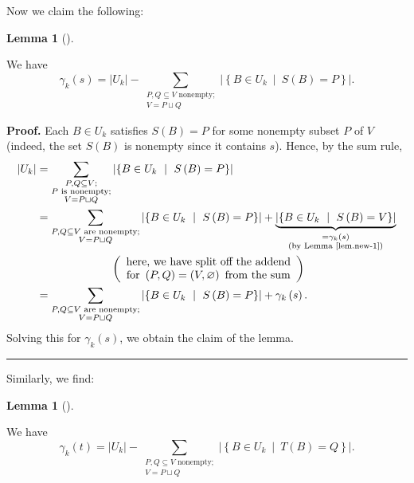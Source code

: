 \documentclass[numbers=enddot,12pt,final,onecolumn,notitlepage]{scrartcl}%
\theoremstyle{definition}
\newtheorem{lem}[theo]{Lemma}
\newenvironment{lemma}[1][]
{\begin{lem}[#1]\begin{leftbar}}
{\end{leftbar}\end{lem}}
\newenvironment{proof}[1][Proof]{\noindent\textbf{#1.} }{\ \rule{0.5em}{0.5em}}
\let\sumnonlimits\sum
\renewcommand{\sum}{\sumnonlimits\limits}
\theoremstyle{plainsl}
\begin{document}
Now we claim the following:

\begin{lemma}
\label{lem.new1} We have%
\[
\gamma_{k}\left(  s\right)  =\left\vert U_{k}\right\vert -\sum
_{\substack{P,Q\subseteq V\text{ nonempty;}\\V=P\sqcup Q}}\left\vert \left\{
B\in U_{k}\ \mid\ S\left(  B\right)  =P\right\}  \right\vert .
\]

\end{lemma}

\begin{proof}
Each $B\in U_{k}$ satisfies $S\left(  B\right)  =P$ for some nonempty subset
$P$ of $V$ (indeed, the set $S\left(  B\right)  $ is nonempty since it
contains $s$). Hence, by the sum rule,%
\begin{align*}
\left\vert U_{k}\right\vert  &  =\sum_{\substack{P,Q\subseteq V;\\P\text{ is
nonempty;}\\V=P\sqcup Q}}\left\vert \left\{  B\in U_{k}\ \mid\ S\left(
B\right)  =P\right\}  \right\vert \\
&  =\sum_{\substack{P,Q\subseteq V\text{ are nonempty;}\\V=P\sqcup
Q}}\left\vert \left\{  B\in U_{k}\ \mid\ S\left(  B\right)  =P\right\}
\right\vert +\underbrace{\left\vert \left\{  B\in U_{k}\ \mid\ S\left(
B\right)  =V\right\}  \right\vert }_{\substack{=\gamma_{k}\left(  s\right)
\\\text{(by Lemma \ref{lem.new-1})}}}\\
&  \ \ \ \ \ \ \ \ \ \ \ \ \ \ \ \ \ \ \ \ \left(
\begin{array}
[c]{c}%
\text{here, we have split off the addend}\\
\text{for }\left(  P,Q\right)  =\left(  V,\varnothing\right)  \text{ from the
sum}%
\end{array}
\right) \\
&  =\sum_{\substack{P,Q\subseteq V\text{ are nonempty;}\\V=P\sqcup
Q}}\left\vert \left\{  B\in U_{k}\ \mid\ S\left(  B\right)  =P\right\}
\right\vert +\gamma_{k}\left(  s\right)  .
\end{align*}
Solving this for $\gamma_{k}\left(  s\right)  $, we obtain the claim of the lemma.
\end{proof}

Similarly, we find:

\begin{lemma}
\label{lem.new2}We have%
\[
\gamma_{k}\left(  t\right)  =\left\vert U_{k}\right\vert -\sum
_{\substack{P,Q\subseteq V\text{ nonempty;}\\V=P\sqcup Q}}\left\vert \left\{
B\in U_{k}\ \mid\ T\left(  B\right)  =Q\right\}  \right\vert .
\]

\end{lemma}
\end{document}

